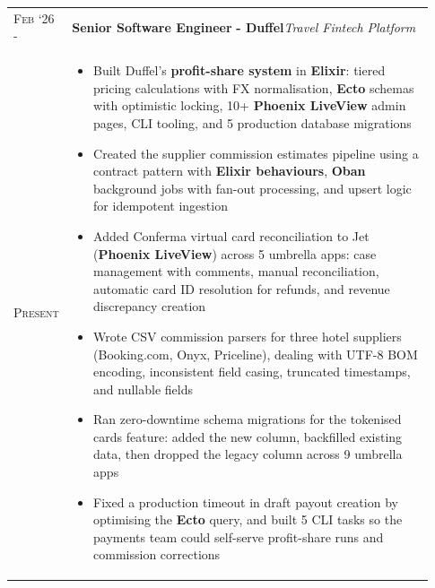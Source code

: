 \documentclass[a4paper,10pt]{extarticle} %
\begin{document}
{\begin{longtable}{>{\raggedright\arraybackslash}p{0.08\linewidth} | >{\raggedright\arraybackslash}p{0.85\linewidth}}
\textsc{Feb ‘26 -} & \textbf{Senior Software Engineer} \textbf{ - Duffel}\hfill\textit{Travel Fintech Platform}\\
\textsc{Present} & \parbox[t]{\linewidth}{
\vspace{-7pt}
\begin{itemize}[leftmargin=*, itemsep=3pt]
    \item Built Duffel's \textbf{profit-share system} in \textbf{Elixir}: tiered pricing calculations with FX normalisation, \textbf{Ecto} schemas with optimistic locking, 10+ \textbf{Phoenix LiveView} admin pages, CLI tooling, and 5 production database migrations
    \item Created the supplier commission estimates pipeline using a contract pattern with \textbf{Elixir behaviours}, \textbf{Oban} background jobs with fan-out processing, and upsert logic for idempotent ingestion
    \item Added Conferma virtual card reconciliation to Jet (\textbf{Phoenix LiveView}) across 5 umbrella apps: case management with comments, manual reconciliation, automatic card ID resolution for refunds, and revenue discrepancy creation
    \item Wrote CSV commission parsers for three hotel suppliers (Booking.com, Onyx, Priceline), dealing with UTF-8 BOM encoding, inconsistent field casing, truncated timestamps, and nullable fields
    \item Ran zero-downtime schema migrations for the tokenised cards feature: added the new column, backfilled existing data, then dropped the legacy column across 9 umbrella apps
    \item Fixed a production timeout in draft payout creation by optimising the \textbf{Ecto} query, and built 5 CLI tasks so the payments team could self-serve profit-share runs and commission corrections
\end{itemize}
}\\
 \\


\end{longtable}}
\end{document}
